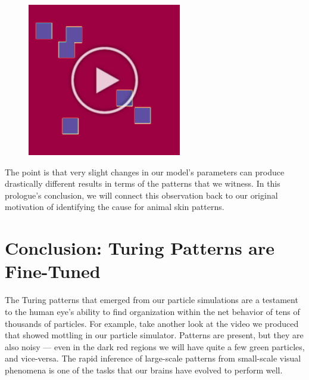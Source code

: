 {{\begin{figure}[h]
\centering
\mySfFamily
\includegraphics[width = 0.6\textwidth]{../assets/images/600px/gray-scott_f42_k59_first_frame.png}
\caption{}
\label{fig:gray-scott_f42_k59_first_frame}
\end{figure}

The point is that very slight changes in our model's parameters can produce drastically different results in terms of the patterns that we witness. In this prologue's conclusion, we will connect this observation back to our original motivation of identifying the cause for animal skin patterns.



















\FloatBarrier
{}

\section{Conclusion: Turing Patterns are Fine-Tuned}
\label{sec:conclusion:_turing_patterns_are_fine-tuned}


The Turing patterns that emerged from our particle simulations are a testament to the human eye's ability to find organization within the net behavior of tens of thousands of particles. For example, take another look at the video we produced that showed mottling in our particle simulator. Patterns are present, but they are also noisy --- even in the dark red regions we will have quite a few green particles, and vice-versa. The rapid inference of large-scale patterns from small-scale visual phenomena is one of the tasks that our brains have evolved to perform well.

}}
